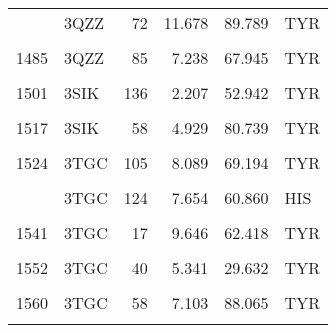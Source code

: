 \begin{table}
\begin{tabular}{llrrrl}
			\addlinespace
			1481 & 3QZZ & 72 & 11.678 & 89.789 & TYR\\
			\cellcolor{gray!6}{1482} & \cellcolor{gray!6}{3QZZ} & \cellcolor{gray!6}{73} & \cellcolor{gray!6}{8.935} & \cellcolor{gray!6}{40.394} & \cellcolor{gray!6}{TYR}\\
			1485 & 3QZZ & 85 & 7.238 & 67.945 & TYR\\
			\cellcolor{gray!6}{1487} & \cellcolor{gray!6}{3QZZ} & \cellcolor{gray!6}{9} & \cellcolor{gray!6}{7.361} & \cellcolor{gray!6}{61.739} & \cellcolor{gray!6}{TYR}\\
			1501 & 3SIK & 136 & 2.207 & 52.942 & TYR\\
			\addlinespace
			\cellcolor{gray!6}{1504} & \cellcolor{gray!6}{3SIK} & \cellcolor{gray!6}{140} & \cellcolor{gray!6}{2.707} & \cellcolor{gray!6}{63.829} & \cellcolor{gray!6}{TYR}\\
			1517 & 3SIK & 58 & 4.929 & 80.739 & TYR\\
			\cellcolor{gray!6}{1523} & \cellcolor{gray!6}{3TGC} & \cellcolor{gray!6}{104} & \cellcolor{gray!6}{9.882} & \cellcolor{gray!6}{87.772} & \cellcolor{gray!6}{TYR}\\
			1524 & 3TGC & 105 & 8.089 & 69.194 & TYR\\
			\cellcolor{gray!6}{1528} & \cellcolor{gray!6}{3TGC} & \cellcolor{gray!6}{120} & \cellcolor{gray!6}{8.242} & \cellcolor{gray!6}{64.898} & \cellcolor{gray!6}{HIS}\\
			\addlinespace
			1531 & 3TGC & 124 & 7.654 & 60.860 & HIS\\
			\cellcolor{gray!6}{1536} & \cellcolor{gray!6}{3TGC} & \cellcolor{gray!6}{134} & \cellcolor{gray!6}{5.409} & \cellcolor{gray!6}{80.162} & \cellcolor{gray!6}{TYR}\\
			1541 & 3TGC & 17 & 9.646 & 62.418 & TYR\\
			\cellcolor{gray!6}{1545} & \cellcolor{gray!6}{3TGC} & \cellcolor{gray!6}{28} & \cellcolor{gray!6}{6.645} & \cellcolor{gray!6}{42.557} & \cellcolor{gray!6}{TYR}\\
			1552 & 3TGC & 40 & 5.341 & 29.632 & TYR\\
			\addlinespace
			\cellcolor{gray!6}{1553} & \cellcolor{gray!6}{3TGC} & \cellcolor{gray!6}{41} & \cellcolor{gray!6}{6.277} & \cellcolor{gray!6}{64.234} & \cellcolor{gray!6}{CYS}\\
			1560 & 3TGC & 58 & 7.103 & 88.065 & TYR\\
			\cellcolor{gray!6}{1561} & \cellcolor{gray!6}{3TGC} & \cellcolor{gray!6}{59} & \cellcolor{gray!6}{2.123} & \cellcolor{gray!6}{87.207} & \cellcolor{gray!6}{HIS}\\

\end{tabular}
\end{table}
